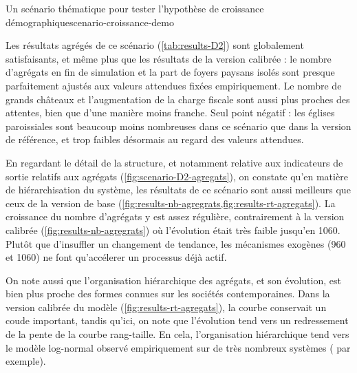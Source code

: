\begin{encadre}{Un scénario thématique pour tester l'hypothèse de croissance démographique}{scenario-croissance-demo}

\smallskip

\vspace*{1em} Les résultats agrégés de ce scénario (\cref{tab:results-D2}) sont globalement satisfaisants, et même plus que les résultats de la version calibrée : le nombre d'agrégats en fin de simulation et la part de foyers paysans isolés sont presque parfaitement ajustés aux valeurs attendues fixées empiriquement.
Le nombre de grands châteaux et l'augmentation de la charge fiscale sont aussi plus proches des attentes, bien que d'une manière moins franche.
Seul point négatif : les églises paroissiales sont beaucoup moins nombreuses dans ce scénario que dans la version de référence, et trop faibles désormais au regard des valeurs attendues.

\vspace*{1em} En regardant le détail de la structure, et notamment relative aux indicateurs de sortie relatifs aux agrégats (\cref{fig:scenario-D2-agregats}), on constate qu'en matière de hiérarchisation du système, les résultats de ce scénario sont aussi meilleurs que ceux de la version de base (\cref{fig:results-nb-agregrats,fig:results-rt-agregats}).
La croissance du nombre d'agrégats y est assez régulière, contrairement à la version calibrée (\cref{fig:results-nb-agregrats}) où l'évolution était très faible jusqu'en 1060.
Plutôt que d'insuffler un changement de tendance, les mécanismes exogènes (960 et 1060) ne font qu'accélerer un processus déjà actif.

On note aussi que l'organisation hiérarchique des agrégats, et son évolution, est bien plus proche des formes connues sur les sociétés contemporaines.
Dans la version calibrée du modèle (\cref{fig:results-rt-agregats}), la courbe conservait un \og coude\fg{} important, tandis qu'ici, on note que l'évolution tend vers un redressement de la pente de la courbe rang-taille.
En cela, l'organisation hiérarchique tend vers le modèle log-normal observé empiriquement sur de très nombreux systèmes (\textcite{cura_old_2017} par exemple).


\end{encadre}
